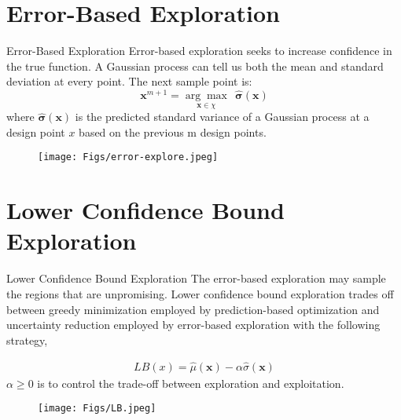 \documentclass{beamer}
\begin{document}
\section{Error-Based Exploration}
\begin{frame}{Error-Based Exploration}
Error-based exploration seeks to increase confidence in the true function. A Gaussian process can tell us both the mean and standard deviation at every point. The next sample point is:
\begin{equation*}
    \boldsymbol{x}^{m+1} = \underset{\boldsymbol{x}\in \chi}{\arg\max}~~ \hat{\boldsymbol{\sigma}}(\boldsymbol{x})
\end{equation*}
where $\hat{\boldsymbol{\sigma}}(\boldsymbol{x})$ is the predicted standard variance of a Gaussian process at a design point $x$ based on the previous m design points. 

\begin{figure}
\centering
\texttt{[image: Figs/error-explore.jpeg]}
\end{figure} 
\end{frame}


\section{Lower Confidence Bound Exploration}
\begin{frame}{Lower Confidence Bound Exploration}
The error-based exploration may sample the regions that are unpromising. Lower confidence bound exploration trades off between greedy minimization employed by prediction-based optimization and uncertainty reduction employed by error-based exploration with the following strategy,

\begin{gather*}
    LB(x) = \hat{\mu}(\boldsymbol{x})-\alpha \hat{\sigma}(\boldsymbol{x})
\end{gather*}
$\alpha \geq 0$ is to control the trade-off between exploration and exploitation. 
\begin{figure}
\centering
\texttt{[image: Figs/LB.jpeg]}
\end{figure} 

\end{frame}
\end{document}
